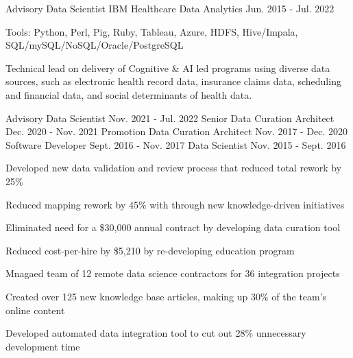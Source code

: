 \begin{cventries}
  \cvexpentry
    {Advisory Data Scientist} %
    {IBM} %
    {Healthcare Data Analytics} %
    {Jun. 2015 - Jul. 2022} %
    {
      \begin{cvheavyparagraph}
        Tools: Python, Perl, Pig, Ruby, Tableau, Azure, HDFS, Hive/Impala, SQL/mySQL/NoSQL/Oracle/PostgreSQL
      \end{cvheavyparagraph}
    }
    {
      \begin{cvparagraph}
        Technical lead on delivery of Cognitive \& AI led programs using diverse data sources, such as electronic health record data, insurance claims data, scheduling and financial data, and social determinants of health data.
      \end{cvparagraph}
      \begin{cvpositions}
        \cvposition
          {Advisory Data Scientist} %
          {Nov. 2021 - Jul. 2022} %
          {} %
        \cvposition
          {Senior Data Curation Architect} %
          {Dec. 2020 - Nov. 2021} %
          {Promotion} %
        \cvposition
          {Data Curation Architect} %
          {Nov. 2017 - Dec. 2020} %
          {} %
        \cvposition
          {Software Developer} %
          {Sept. 2016 - Nov. 2017} %
          {} %
        \cvposition
          {Data Scientist} %
          {Nov. 2015 - Sept. 2016} %
          {} %
      \end{cvpositions}
      \begin{cvitems}
        \item {Developed new data validation and review process that reduced total rework by 25\%}
        \item {Reduced mapping rework by 45\% with through new knowledge-driven initiatives}
        \item {Eliminated need for a \$30,000 annual contract by developing data curation tool}
        \item {Reduced cost-per-hire by \$5,210 by re-developing education program}
        \item {Mnagaed team of 12 remote data science contractors for 36 integration projects}
        \item {Created over 125 new knowledge base articles, making up 30\% of the team's online content}
        \item {Developed automated data integration tool to cut out 28\% unnecessary development time}
      \end{cvitems}
    }


\end{cventries}
